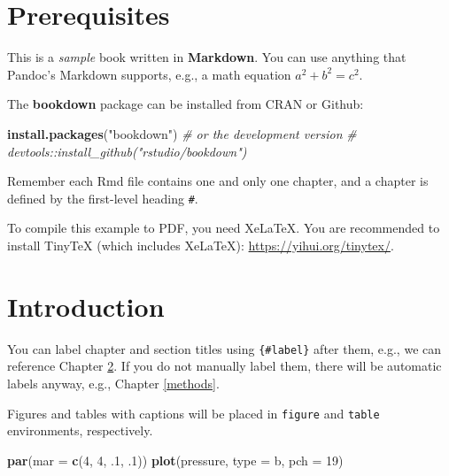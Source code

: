 \documentclass[
]{book}
\author{Sebastian Ariza y Joseph Arias}
\date{2026-07-29}
\newenvironment{Shaded}{\begin{snugshade}}{\end{snugshade}}
\newcommand{\AttributeTok}[1]{\textcolor[rgb]{0.13,0.29,0.53}{#1}}
\newcommand{\CommentTok}[1]{\textcolor[rgb]{0.56,0.35,0.01}{\textit{#1}}}
\newcommand{\DecValTok}[1]{\textcolor[rgb]{0.00,0.00,0.81}{#1}}
\newcommand{\FunctionTok}[1]{\textcolor[rgb]{0.13,0.29,0.53}{\textbf{#1}}}
\newcommand{\NormalTok}[1]{#1}
\newcommand{\StringTok}[1]{\textcolor[rgb]{0.31,0.60,0.02}{#1}}
\begin{document}
{
\setcounter{tocdepth}{1}
\tableofcontents
}
\chapter{Prerequisites}\label{prerequisites}

This is a \emph{sample} book written in \textbf{Markdown}. You can use anything that Pandoc's Markdown supports, e.g., a math equation \(a^2 + b^2 = c^2\).

The \textbf{bookdown} package can be installed from CRAN or Github:

\begin{Shaded}
\begin{Highlighting}[]
\FunctionTok{install.packages}\NormalTok{(}\StringTok{"bookdown"}\NormalTok{)}
\CommentTok{\# or the development version}
\CommentTok{\# devtools::install\_github("rstudio/bookdown")}
\end{Highlighting}
\end{Shaded}

Remember each Rmd file contains one and only one chapter, and a chapter is defined by the first-level heading \texttt{\#}.

To compile this example to PDF, you need XeLaTeX. You are recommended to install TinyTeX (which includes XeLaTeX): \url{https://yihui.org/tinytex/}.

\chapter{Introduction}\label{intro}

You can label chapter and section titles using \texttt{\{\#label\}} after them, e.g., we can reference Chapter \ref{intro}. If you do not manually label them, there will be automatic labels anyway, e.g., Chapter \ref{methods}.

Figures and tables with captions will be placed in \texttt{figure} and \texttt{table} environments, respectively.

\begin{Shaded}
\begin{Highlighting}[]
\FunctionTok{par}\NormalTok{(}\AttributeTok{mar =} \FunctionTok{c}\NormalTok{(}\DecValTok{4}\NormalTok{, }\DecValTok{4}\NormalTok{, .}\DecValTok{1}\NormalTok{, .}\DecValTok{1}\NormalTok{))}
\FunctionTok{plot}\NormalTok{(pressure, }\AttributeTok{type =} \StringTok{\textquotesingle{}b\textquotesingle{}}\NormalTok{, }\AttributeTok{pch =} \DecValTok{19}\NormalTok{)}
\end{Highlighting}
\end{Shaded}
\end{document}
